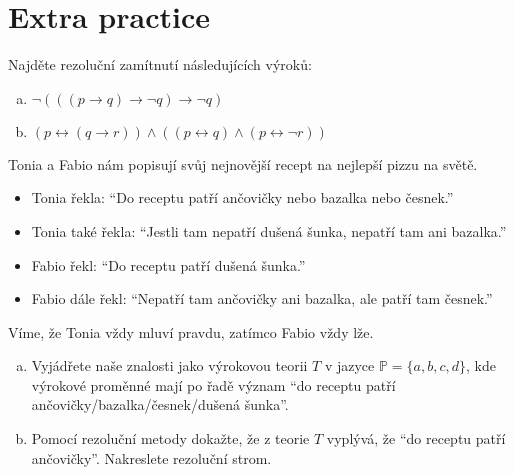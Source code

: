         
\section*{Extra practice}
        

\begin{problem}
    
    Najděte rezoluční zamítnutí následujících výroků:
    \begin{enumerate}[(a)]
        \item $\neg(((p\to q)\to \neg q)\to \neg q)$
        \item $(p\leftrightarrow (q\to r))\wedge((p\leftrightarrow q)\wedge(p\leftrightarrow \neg r))$        
    \end{enumerate}
\end{problem}


\begin{problem}

    Tonia a Fabio nám popisují svůj nejnovější recept na nejlepší pizzu na světě.
    \begin{itemize}
        \item Tonia řekla: ``Do receptu patří ančovičky nebo bazalka nebo česnek.''
        \item Tonia také řekla: ``Jestli tam nepatří dušená šunka, nepatří tam ani bazalka.''
        \item Fabio řekl: ``Do receptu patří dušená šunka.'' 
        \item Fabio dále řekl: ``Nepatří tam ančovičky ani bazalka, ale patří tam česnek.''
    \end{itemize}
    Víme, že Tonia vždy mluví pravdu, zatímco Fabio vždy lže.

    \begin{enumerate}[(a)]
        \item Vyjádřete naše znalosti jako výrokovou teorii $T$ v jazyce $\mathbb P=\{a,b,c,d\}$, kde výrokové proměnné mají po řadě význam ``do receptu patří ančovičky/bazalka/česnek/dušená šunka''.
        \item Pomocí rezoluční metody dokažte, že z teorie $T$ vyplývá, že ``do receptu patří ančovičky''. Nakreslete rezoluční strom.
    \end{enumerate}

\end{problem}


